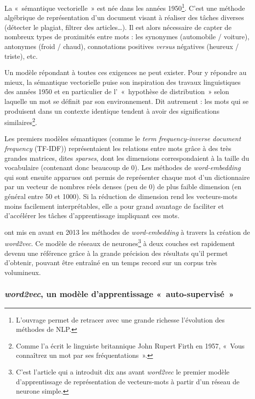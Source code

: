 \documentclass[11pt,french,french]{article}
\let\rmarkdownfootnote\footnote%
\def\footnote{\protect\rmarkdownfootnote}
\begin{document}
La «~sémantique vectorielle~» est née dans les années 1950\footnote{L'ouvrage
  \cite{Jurafsky} permet de retracer avec une grande richesse
  l'évolution des méthodes de NLP.}. C'est une méthode algébrique de
représentation d'un document visant à réaliser des tâches diverses
(détecter le plagiat, filtrer des articles\dots). Il est alors
nécessaire de capter de nombreux types de proximités entre mots : les
synonymes (automobile / voiture), antonymes (froid / chaud),
connotations positives \emph{versus} négatives (heureux / triste), etc.

Un modèle répondant à toutes ces exigences ne peut exister. Pour y
répondre au mieux, la sémantique vectorielle puise son inspiration des
travaux linguistiques des années 1950 et en particulier de
l'~«~hypothèse de distribution~» selon laquelle un mot se définit par
son environnement. Dit autrement : les mots qui se produisent dans un
contexte identique tendent à avoir des significations
similaires\footnote{Comme l'a écrit le linguiste britannique John Rupert
  Firth en 1957, «~Vous connaîtrez un mot par ses fréquentations~».}.

Les premiers modèles sémantiques (comme le \emph{term frequency-inverse
document frequency} (TF-IDF)) représentaient les relations entre mots
grâce à des très grandes matrices, dites \emph{sparses}, dont les
dimensions correspondaient à la taille du vocabulaire (contenant donc
beaucoup de 0). Les méthodes de \emph{word-embedding} qui sont ensuite
apparues ont permis de représenter chaque mot d'un dictionnaire par un
vecteur de nombres réels denses (peu de 0) de plus faible dimension (en
général entre 50 et 1000). Si la réduction de dimension rend les
vecteurs-mots moins facilement interprétables, elle a pour grand
avantage de faciliter et d'accélérer les tâches d'apprentissage
impliquant ces mots.

\cite{Mikolov} ont mis en avant en 2013 les méthodes de
\emph{word-embedding} à travers la création de \emph{word2vec}. Ce
modèle de réseaux de neurones\footnote{C'est l'article \cite{Bengio} qui
  a introduit dix ans avant \emph{word2vec} le premier modèle
  d'apprentissage de représentation de vecteurs-mots à partir d'un
  réseau de neurone simple.} à deux couches est rapidement devenu une
référence grâce à la grande précision des résultats qu'il permet
d'obtenir, pouvant être entraîné en un temps record sur un corpus très
volumineux.

\subsubsection{\texorpdfstring{\emph{word2vec}, un modèle
d'apprentissage
«~auto-supervisé~»}{word2vec, un modèle d'apprentissage «~auto-supervisé~»}}\label{subsec:word2vec}
\end{document}
